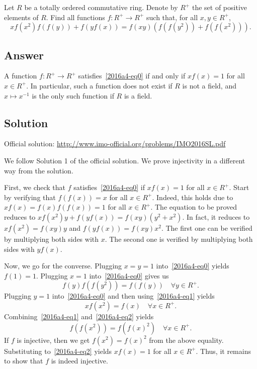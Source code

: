 Let $R$ be a totally ordered commutative ring.
Denote by $R^+$ the set of positive elements of $R$.
Find all functions $f : R^+ \to R^+$ such that, for all $x, y \in R^+$,
\[ x f(x^2) f(f(y)) + f(y f(x)) = f(xy) (f(f(y^2)) + f(f(x^2))). \tag{*}\label{2016a4-eq0} \]



\subsection*{Answer}

A function $f : R^+ \to R^+$ satisfies~\eqref{2016a4-eq0} if and only if $x f(x) = 1$ for all $x \in R^+$.
In particular, such a function does not exist if $R$ is not a field, and $x \mapsto x^{-1}$ is the only such function if $R$ is a field.



\subsection*{Solution}

Official solution: \url{http://www.imo-official.org/problems/IMO2016SL.pdf}

We follow Solution 1 of the official solution.
We prove injectivity in a different way from the solution.

First, we check that $f$ satisfies~\eqref{2016a4-eq0} if $x f(x) = 1$ for all $x \in R^+$.
Start by verifying that $f(f(x)) = x$ for all $x \in R^+$.
Indeed, this holds due to $x f(x) = f(x) f(f(x)) = 1$ for all $x \in R^+$.
The equation to be proved reduces to $x f(x^2) y + f(y f(x)) = f(xy) (y^2 + x^2)$.
In fact, it reduces to $x f(x^2) = f(xy) y$ and $f(y f(x)) = f(xy) x^2$.
The first one can be verified by multiplying both sides with $x$.
The second one is verified by multiplying both sides with $y f(x)$.

Now, we go for the converse.
Plugging $x = y = 1$ into~\eqref{2016a4-eq0} yields $f(1) = 1$.
Plugging $x = 1$ into~\eqref{2016a4-eq0} gives us
\[ f(y) f(f(y^2)) = f(f(y)) \quad \forall y \in R^+. \tag{1}\label{2016a4-eq1} \]
Plugging $y = 1$ into~\eqref{2016a4-eq0} and then using~\eqref{2016a4-eq1} yields
\[ x f(x^2) = f(x) \quad \forall x \in R^+. \tag{2}\label{2016a4-eq2} \]
Combining~\eqref{2016a4-eq1} and~\eqref{2016a4-eq2} yields
\[ f(f(x^2)) = f(f(x)^2) \quad \forall x \in R^+. \tag{3}\label{2016a4-eq3} \]
If $f$ is injective, then we get $f(x^2) = f(x)^2$ from the above equality.
Substituting to~\eqref{2016a4-eq2} yields $x f(x) = 1$ for all $x \in R^+$.
Thus, it remains to show that $f$ is indeed injective.

